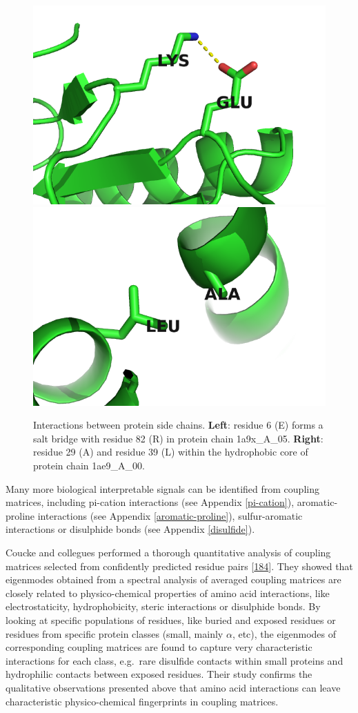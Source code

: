 \documentclass[11pt,a4paper,twoside]{book}
\theoremstyle{definition}
\theoremstyle{definition}
\theoremstyle{remark}
\begin{document}
\begin{figure}
\includegraphics[width=0.5\linewidth]{img/coupling_matrix_analysis/1a9xA05_6_82} \includegraphics[width=0.5\linewidth]{img/coupling_matrix_analysis/1ae9A00_29_39} \caption{Interactions between protein side
chains. \textbf{Left}: residue 6 (E) forms a salt bridge with residue 82
(R) in protein chain 1a9x\_A\_05. \textbf{Right}: residue 29 (A) and
residue 39 (L) within the hydrophobic core of protein chain 1ae9\_A\_00.}\label{fig:coupling-matrix-pymol}
\end{figure}

Many more biological interpretable signals can be identified from
coupling matrices, including pi-cation interactions (see Appendix
\ref{pi-cation}), aromatic-proline interactions (see Appendix
\ref{aromatic-proline}), sulfur-aromatic interactions or disulphide
bonds (see Appendix \ref{disulfide}).

Coucke and collegues performed a thorough quantitative analysis of
coupling matrices selected from confidently predicted residue pairs
{[}\protect\hyperlink{ref-Coucke2016}{184}{]}. They showed that
eigenmodes obtained from a spectral analysis of averaged coupling
matrices are closely related to physico-chemical properties of amino
acid interactions, like electrostaticity, hydrophobicity, steric
interactions or disulphide bonds. By looking at specific populations of
residues, like buried and exposed residues or residues from specific
protein classes (small, mainly \(\alpha\), etc), the eigenmodes of
corresponding coupling matrices are found to capture very characteristic
interactions for each class, e.g.~rare disulfide contacts within small
proteins and hydrophilic contacts between exposed residues. Their study
confirms the qualitative observations presented above that amino acid
interactions can leave characteristic physico-chemical fingerprints in
coupling matrices.
\end{document}
